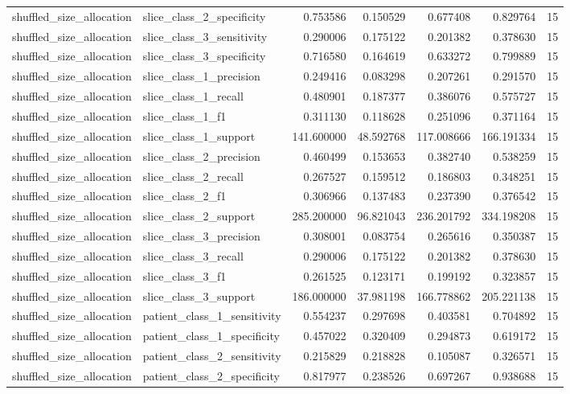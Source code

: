 \begin{tabular}{llrrrrr}
shuffled_size_allocation & slice_class_2_specificity & 0.753586 & 0.150529 & 0.677408 & 0.829764 & 15 \\
shuffled_size_allocation & slice_class_3_sensitivity & 0.290006 & 0.175122 & 0.201382 & 0.378630 & 15 \\
shuffled_size_allocation & slice_class_3_specificity & 0.716580 & 0.164619 & 0.633272 & 0.799889 & 15 \\
shuffled_size_allocation & slice_class_1_precision & 0.249416 & 0.083298 & 0.207261 & 0.291570 & 15 \\
shuffled_size_allocation & slice_class_1_recall & 0.480901 & 0.187377 & 0.386076 & 0.575727 & 15 \\
shuffled_size_allocation & slice_class_1_f1 & 0.311130 & 0.118628 & 0.251096 & 0.371164 & 15 \\
shuffled_size_allocation & slice_class_1_support & 141.600000 & 48.592768 & 117.008666 & 166.191334 & 15 \\
shuffled_size_allocation & slice_class_2_precision & 0.460499 & 0.153653 & 0.382740 & 0.538259 & 15 \\
shuffled_size_allocation & slice_class_2_recall & 0.267527 & 0.159512 & 0.186803 & 0.348251 & 15 \\
shuffled_size_allocation & slice_class_2_f1 & 0.306966 & 0.137483 & 0.237390 & 0.376542 & 15 \\
shuffled_size_allocation & slice_class_2_support & 285.200000 & 96.821043 & 236.201792 & 334.198208 & 15 \\
shuffled_size_allocation & slice_class_3_precision & 0.308001 & 0.083754 & 0.265616 & 0.350387 & 15 \\
shuffled_size_allocation & slice_class_3_recall & 0.290006 & 0.175122 & 0.201382 & 0.378630 & 15 \\
shuffled_size_allocation & slice_class_3_f1 & 0.261525 & 0.123171 & 0.199192 & 0.323857 & 15 \\
shuffled_size_allocation & slice_class_3_support & 186.000000 & 37.981198 & 166.778862 & 205.221138 & 15 \\
shuffled_size_allocation & patient_class_1_sensitivity & 0.554237 & 0.297698 & 0.403581 & 0.704892 & 15 \\
shuffled_size_allocation & patient_class_1_specificity & 0.457022 & 0.320409 & 0.294873 & 0.619172 & 15 \\
shuffled_size_allocation & patient_class_2_sensitivity & 0.215829 & 0.218828 & 0.105087 & 0.326571 & 15 \\
shuffled_size_allocation & patient_class_2_specificity & 0.817977 & 0.238526 & 0.697267 & 0.938688 & 15 \\

\end{tabular}
